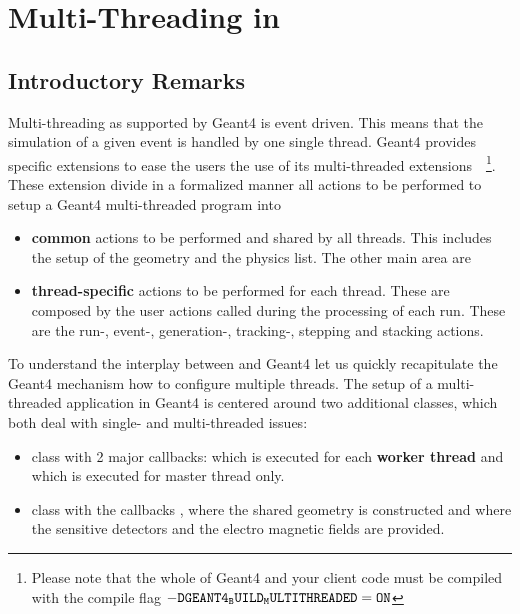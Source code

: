 
\section{Multi-Threading in \DDG}
\label{sec:ddg4-multi-threading}
\subsection{Introductory Remarks}
\label{sec:ddg4-multi-threading-introduction}
\noindent
Multi-threading as supported by Geant4 is event driven. This means that 
the simulation of a given event is handled by one single thread.
Geant4 provides specific extensions to ease the users the use of its 
multi-threaded extensions~\cite{bib:Geant4-multi-threading}~\footnote{Please
note that the whole of Geant4 and your client code must be compiled with
the compile flag ${{\tt\small{-DGEANT4_BUILD_MULTITHREADED=ON}}}$}.
These extension divide in a formalized manner all actions to be performed
to setup a Geant4 multi-threaded program into

\begin{itemize}\itemcompact
\item {\bf{common}} actions to be performed and shared by all threads.
This includes the setup of the geometry and the physics list. The
other main area are
\item {\bf{thread-specific}} actions to be performed for each thread.
These are composed by the user actions called during the processing of
each run. These are the run-, event-, generation-, tracking-, 
stepping and stacking actions.
\end{itemize}

\noindent
To understand the interplay between \DDG and Geant4 let us quickly 
recapitulate the Geant4 mechanism how to configure multiple threads.
The setup of a multi-threaded application in Geant4 is centered around 
two additional classes, which both deal with single- and multi-threaded 
issues:

\begin{itemize}\itemcompact
\item {} class with 2 major callbacks:
	{} which is executed for each {\bf{worker thread}} and 
	{} which is executed for master thread only.	
\item {} class with the callbacks
    {}, where the shared geometry is constructed and
    {} where the sensitive detectors and the
    electro magnetic fields are provided.
\end{itemize}

